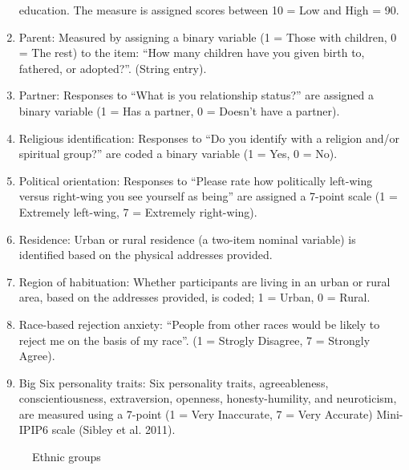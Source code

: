 \documentclass[
]{interact}
\begin{document}
\begin{enumerate}
  education. The measure is assigned scores between 10 = Low and High =
  90.
\item
  Parent: Measured by assigning a binary variable (1 = Those with
  children, 0 = The rest) to the item: ``How many children have you
  given birth to, fathered, or adopted?''. (String entry).
\item
  Partner: Responses to ``What is you relationship status?'' are
  assigned a binary variable (1 = Has a partner, 0 = Doesn't have a
  partner).
\item
  Religious identification: Responses to ``Do you identify with a
  religion and/or spiritual group?'' are coded a binary variable (1 =
  Yes, 0 = No).
\item
  Political orientation: Responses to ``Please rate how politically
  left-wing versus right-wing you see yourself as being'' are assigned a
  7-point scale (1 = Extremely left-wing, 7 = Extremely right-wing).
\item
  Residence: Urban or rural residence (a two-item nominal variable) is
  identified based on the physical addresses provided.
\item
  Region of habituation: Whether participants are living in an urban or
  rural area, based on the addresses provided, is coded; 1 = Urban, 0 =
  Rural.
\item
  Race-based rejection anxiety: ``People from other races would be
  likely to reject me on the basis of my race''. (1 = Strogly Disagree,
  7 = Strongly Agree).
\item
  Big Six personality traits: Six personality traits, agreeableness,
  conscientiousness, extraversion, openness, honesty-humility, and
  neuroticism, are measured using a 7-point (1 = Very Inaccurate, 7 =
  Very Accurate) Mini-IPIP6 scale (Sibley et al. 2011).
\end{enumerate}

\begin{figure}


\caption{\label{fig-ethnicgroups}Ethnic groups}

\end{figure}%
\end{document}
